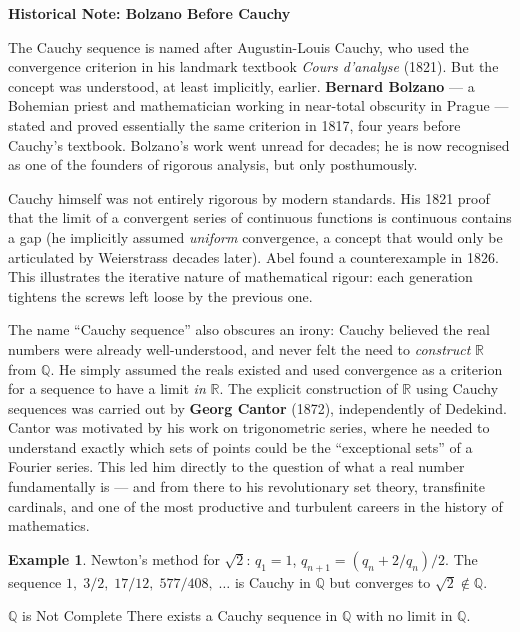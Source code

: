 \documentclass[12pt, openany]{book}
\theoremstyle{plain}
\theoremstyle{definition}
\newtheorem{example}[theorem]{Example}
\theoremstyle{remark}
\newcommand{\Q}{\mathbb{Q}}
\newcommand{\R}{\mathbb{R}}
\begin{document}
\begin{remarkbox}
\textbf{Historical Note: Bolzano Before Cauchy}

The Cauchy sequence is named after Augustin-Louis Cauchy, who used the convergence criterion in his landmark textbook \emph{Cours d'analyse} (1821). But the concept was understood, at least implicitly, earlier. \textbf{Bernard Bolzano} --- a Bohemian priest and mathematician working in near-total obscurity in Prague --- stated and proved essentially the same criterion in 1817, four years before Cauchy's textbook. Bolzano's work went unread for decades; he is now recognised as one of the founders of rigorous analysis, but only posthumously.

Cauchy himself was not entirely rigorous by modern standards. His 1821 proof that the limit of a convergent series of continuous functions is continuous contains a gap (he implicitly assumed \emph{uniform} convergence, a concept that would only be articulated by Weierstrass decades later). Abel found a counterexample in 1826. This illustrates the iterative nature of mathematical rigour: each generation tightens the screws left loose by the previous one.

The name ``Cauchy sequence'' also obscures an irony: Cauchy believed the real numbers were already well-understood, and never felt the need to \emph{construct} $\R$ from $\Q$. He simply assumed the reals existed and used convergence as a criterion for a sequence to have a limit \emph{in} $\R$. The explicit construction of $\R$ using Cauchy sequences was carried out by \textbf{Georg Cantor} (1872), independently of Dedekind. Cantor was motivated by his work on trigonometric series, where he needed to understand exactly which sets of points could be the ``exceptional sets'' of a Fourier series. This led him directly to the question of what a real number fundamentally is --- and from there to his revolutionary set theory, transfinite cardinals, and one of the most productive and turbulent careers in the history of mathematics.
\end{remarkbox}
\color{black}

\begin{example}
Newton's method for $\sqrt{2}$: $q_1 = 1$, $q_{n+1} = (q_n + 2/q_n)/2$. The sequence
$1,\; 3/2,\; 17/12,\; 577/408,\;\ldots$ is Cauchy in $\Q$ but converges to $\sqrt{2} \notin \Q$.
\end{example}

\begin{thmbox}{$\Q$ is Not Complete}
There exists a Cauchy sequence in $\Q$ with no limit in $\Q$.
\end{thmbox}
\color{black}
\end{document}
